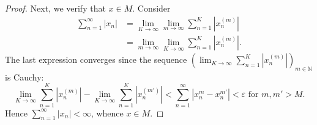 \begin{itemize}
\begin{proof}
	Next, we verify that $x \in M$. Consider
	\begin{align*}
		\sum_{n=1}^{\infty} |x_n| 
		&= \lim_{K \to \infty} \lim_{m \to \infty} \sum_{n=1}^{K} |x^{(m)}_n| \\
		&= \lim_{m \to \infty} \lim_{K \to \infty} \sum_{n=1}^{K} |x^{(m)}_n| 
	.\end{align*} 
	The last expression converges since the sequence $\left( \lim_{K \to \infty} \sum_{n=1}^{K} \left| x^{(m)}_n \right|  \right) _{m \in \mathbb{N}}$ is Cauchy:
	\[
		\lim_{K \to \infty} \sum_{n=1}^{K} \left| x^{(m)}_n \right| - 
		\lim_{K \to \infty} \sum_{n=1}^{K} \left| x^{(m')}_n \right| < 
		\sum_{n=1}^{\infty} \left|x^{m}_n - x^{m'}_n  \right|  < \varepsilon \text{ for } m, m' > M
	.\] 
	Hence 
	$\sum_{n=1}^{\infty} |x_n|  < \infty $, 
	whence $x \in M$. 


\end{proof}
\end{itemize}
